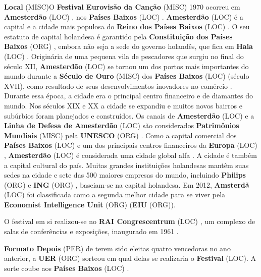 \documentclass[12pt,a4paper]{article}
\begin{document}
\textbf{Local} (MISC)O \textbf{Festival Eurovisão da Canção} (MISC) 1970 ocorreu em \textbf{Amesterdão} (LOC) , nos \textbf{Países Baixos} (LOC) . \textbf{Amesterdão} (LOC) é a capital e a cidade mais populosa do \textbf{Reino dos Países Baixos} (LOC) . O seu estatuto de capital holandesa é garantido pela \textbf{Constituição dos Países Baixos} (ORG) , embora não seja a sede do governo holandês, que fica em \textbf{Haia} (LOC) . Originária de uma pequena vila de pescadores que surgiu no final do século XII, \textbf{Amesterdão} (LOC) se tornou um dos portos mais importantes do mundo durante a \textbf{Século de Ouro} (MISC) dos \textbf{Países Baixos} (LOC) (século XVII), como resultado de seus desenvolvimentos inovadores no comércio . Durante essa época, a cidade era o principal centro financeiro e de diamantes do mundo. Nos séculos XIX e XX a cidade se expandiu e muitos novos bairros e subúrbios foram planejados e construídos. Os canais de \textbf{Amesterdão} (LOC) e a \textbf{Linha de Defesa de Amesterdão} (LOC) são considerados \textbf{Patrimônios Mundiais} (MISC) pela \textbf{UNESCO} (ORG) . Como a capital comercial dos \textbf{Países Baixos} (LOC) e um dos principais centros financeiros da \textbf{Europa} (LOC) , \textbf{Amesterdão} (LOC) é considerada uma cidade global alfa . A cidade é também a capital cultural do país. Muitas grandes instituições holandesas mantêm suas sedes na cidade e sete das 500 maiores empresas do mundo, incluindo \textbf{Philips} (ORG) e \textbf{ING} (ORG) , baseiam-se na capital holandesa. Em 2012, \textbf{Amsterdã} (LOC) foi classificada como a segunda melhor cidade para se viver pela \textbf{Economist Intelligence Unit} (ORG) (\textbf{EIU} (ORG)).

O festival em si realizou-se no \textbf{RAI Congrescentrum} (LOC) , um complexo de salas de conferências e exposições, inaugurado em 1961 .



\textbf{Formato Depois} (PER) de terem sido eleitas quatro vencedoras no ano anterior, a \textbf{UER} (ORG) sorteou em qual delas se realizaria o \textbf{Festival} (LOC). A sorte coube aos \textbf{Países Baixos} (LOC) .
\end{document}
